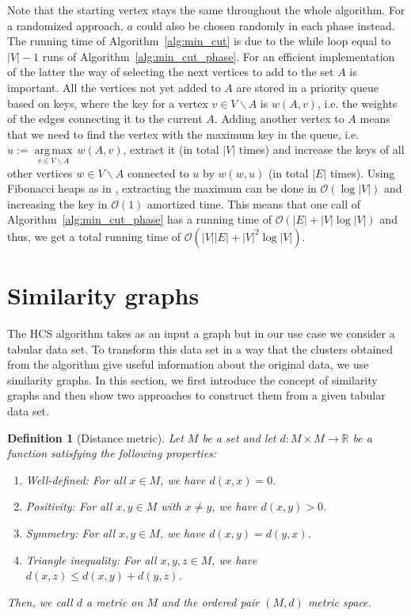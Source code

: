 \documentclass[paper=a4,fontsize=11pt,DIV=8,BCOR=5mm,twoside,pdftex,bibtotocnumbered]{scrreprt}
\newcommand{\R}{{\mathbb R}}
\DeclareMathOperator*{\argmax}{arg\,max}
\theoremstyle{plain}
\newtheorem{definition}[proposition]{Definition}
\begin{document}
Note that the starting vertex stays the same throughout the whole algorithm. For a randomized approach, $a$ could also be chosen randomly in each phase instead. The running time of Algorithm~\ref{alg:min_cut} is due to the while loop equal to $|V|-1$ runs of Algorithm~\ref{alg:min_cut_phase}. For an efficient implementation of the latter the way of selecting the next vertices to add to the set $A$ is important. All the vertices not yet added to $A$ are stored in a priority queue based on keys, where the key for a vertex $v\in V\backslash A$ is $w(A,v)$, i.e. the weights of the edges connecting it to the current $A$. Adding another vertex to $A$ means that we need to find the vertex with the maximum key in the queue, i.e. $u := \underset{v\in V\backslash A}{\argmax} \, w(A,v)$, extract it (in total $|V|$ times) and increase the keys of all other vertices $w \in V\backslash A$ connected to $u$ by $w(w,u)$ (in total $|E|$ times). Using Fibonacci heaps as in \cite{Fredman1987}, extracting the maximum can be done in $\mathcal{O}(\log |V|)$ and increasing the key in $\mathcal{O}(1)$ amortized time. This means that one call of Algorithm~\ref{alg:min_cut_phase} has a running time of $\mathcal{O}(|E| + |V| \log |V|)$ and thus, we get a total running time of $\mathcal{O}( |V| |E| + |V| ^2\log |V|)$.

\section{Similarity graphs}\label{sec:sim_graphs}
The HCS algorithm takes as an input a graph but in our use case we consider a tabular data set. To transform this data set in a way that the clusters obtained from the algorithm give useful information about the original data, we use similarity graphs. In this section, we first introduce the concept of similarity graphs and then show two approaches to construct them from a given tabular data set.

\begin{definition}[Distance metric]\label{def:dist_metric}
	Let $M$ be a set and let $d: M \times M \rightarrow \R$ be a function satisfying the following properties:
	\begin{enumerate}[(1)]
		\item Well-defined: For all $x\in M$, we have $d(x,x)=0$.
		\item Positivity: For all $x, y\in M$ with $x\neq y$, we have $d(x,y)>0$.
		\item Symmetry: For all $x,y\in M$, we have $d(x,y) = d(y,x)$.
		\item Triangle inequality: For all $x,y,z\in M$, we have $d(x,z) \le d(x,y) + d(y,z)$.
	\end{enumerate}
	Then, we call $d$ a \emph{metric} on $M$ and the ordered pair $(M,d)$ \emph{metric space}.
\end{definition}
\end{document}
